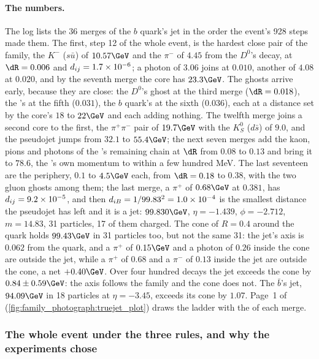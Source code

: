 \paragraph{The numbers.} The  log lists the 36 merges of the
$b$ quark's jet in the order the event's 928 steps made them. The first,
step 12 of the whole event, is the hardest close pair of the family, the
$K^-$ ($s\bar u$) of $10.57\GeV$ and the $\pi^-$ of $4.45$ from the
$D^0$'s decay, at $\dR=0.006$ and $d_{ij}=1.7\times10^{-6}$; a photon of
$3.06$ joins at $0.010$, another of $4.08$ at $0.020$, and by the seventh
merge the core has $23.3\GeV$. The ghosts arrive early, because they are
close: the $D^0$'s ghost at the third merge ($\dR=0.018$), the \Bbar's at
the fifth ($0.031$), the $b$ quark's at the sixth ($0.036$), each at a
distance set by the core's $18$ to $22\GeV$ and each adding nothing. The
twelfth merge joins a second core to the first, the $\pi^+\pi^-$ pair of
$19.7\GeV$ with the $K_S^0$ ($d\bar s$) of $9.0$, and the pseudojet jumps
from $32.1$ to $55.4\GeV$; the next seven merges add the kaon, pions and
photons of the \Bbar's remaining chain at $\dR$ from $0.08$ to $0.13$ and
bring it to $78.6$, the \Bbar's own momentum to within a few hundred MeV.
The last seventeen are the periphery, $0.1$ to $4.5\GeV$ each, from
$\dR=0.18$ to $0.38$, with the two gluon ghosts among them; the last
merge, a $\pi^+$ of $0.68\GeV$ at $0.381$, has $d_{ij}=9.2\times10^{-5}$, and
then $d_{iB}=1/99.83^2=1.0\times10^{-4}$ is the smallest distance the
pseudojet has left and it is a jet: $99.830\GeV$, $\eta=-1.439$,
$\phi=-2.712$, $m=14.83$, 31 particles, 17 of them charged. The cone of
$R=0.4$ around the quark holds $99.43\GeV$ in 31 particles too, but not
the same 31: the jet's axis is $0.062$ from the quark, and a $\pi^+$ of
$0.15\GeV$ and a photon of $0.26$ inside the cone are outside the jet,
while a $\pi^+$ of $0.68$ and a $\pi^-$ of $0.13$ inside the jet are
outside the cone, a net $+0.40\GeV$. Over four hundred decays the jet
exceeds the cone by $0.84\pm0.59\GeV$: the axis follows the family and the
cone does not. The $\bar b$'s jet, $94.09\GeV$ in 18 particles at
$\eta=-3.45$, exceeds its cone by $1.07$. Page~1 of
 (\cref{fig:family_photograph:truejet_plot})
draws the ladder with the \dR of each merge.

\subsubsection{The whole event under the three rules, and why the experiments chose \antikt}
\label{sec:family_photograph:three_rules}

